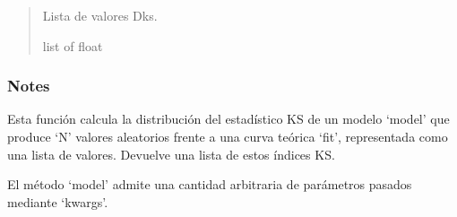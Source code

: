 \documentclass[letterpaper,10pt,english]{sphinxmanual}
\begin{document}
\begin{fulllineitems}
\begin{quote}
\begin{description}
\begin{itemize}
\end{itemize}

\sphinxAtStartPar
Lista de valores Dks.

\sphinxAtStartPar
list of float

\end{description}\end{quote}
\subsubsection*{Notes}

\sphinxAtStartPar
Esta función calcula la distribución del estadístico KS de un modelo ‘model’ que produce ‘N’ valores aleatorios frente a
una curva teórica ‘fit’, representada como una lista de valores. Devuelve una lista de estos índices KS.

\sphinxAtStartPar
El método ‘model’ admite una cantidad arbitraria de parámetros pasados mediante ‘kwargs’.

\end{fulllineitems}

\end{document}
